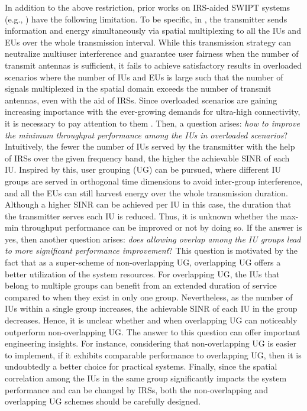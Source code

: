 \documentclass[12pt,draftclsnofoot, onecolumn]{IEEEtran}
\theoremstyle{plain}
\begin{document}
\begin{sloppypar}
In addition to the above restriction, prior works on IRS-aided SWIPT systems (e.g., \cite{2020_Qingqing_SWIPT_letter,2020_Qingqing_SWIPT_QoS,2020_Cunhua_SWIPT,2020_Wei_SWIPT_secure,2021_Shayan_SWIPT}) have the following limitation. To be specific, in \cite{2020_Qingqing_SWIPT_letter,2020_Qingqing_SWIPT_QoS,2020_Cunhua_SWIPT,2020_Wei_SWIPT_secure,2021_Shayan_SWIPT}, the transmitter sends information and energy simultaneously via spatial multiplexing to all the IUs and EUs over the whole transmission interval. While this transmission strategy can neutralize multiuser interference and guarantee user fairness when the number of transmit antennas is sufficient, it fails to achieve satisfactory results in overloaded scenarios where the number of IUs and EUs is large such that the number of signals multiplexed in the spatial domain exceeds the number of transmit antennas, even with the aid of IRSs. Since overloaded scenarios are gaining increasing importance with the ever-growing demands for ultra-high connectivity, it is necessary to pay attention to them \cite{2017_Hamdi_overloaded}. Then, a question arises: \emph{how to improve the minimum throughput performance among the IUs in overloaded scenarios}? Intuitively, the fewer the number of IUs served by the transmitter with the help of IRSs over the given frequency band, the higher the achievable SINR of each IU. Inspired by this, user grouping (UG) can be pursued, where different IU groups are served in orthogonal time dimensions to avoid inter-group interference, and all the EUs can still harvest energy over the whole transmission duration. Although a higher SINR can be achieved per IU in this case, the duration that the transmitter serves each IU is reduced. Thus, it is unknown whether the max-min throughput performance can be improved or not by doing so. If the answer is yes, then another question arises: \emph{does allowing overlap among the IU groups lead to more significant performance improvement}? This question is motivated by the fact that as a super-scheme of non-overlapping UG, overlapping UG offers a better utilization of the system resources. For overlapping UG, the IUs that belong to multiple groups can benefit from an extended duration of service compared to when they exist in only one group. Nevertheless, as the number of IUs within a single group increases, the achievable SINR of each IU in the group decreases. Hence, it is unclear whether and when overlapping UG can noticeably outperform non-overlapping UG. The answer to this question can offer important engineering insights. For instance, considering that non-overlapping UG is easier to implement, if it exhibits comparable performance to overlapping UG, then it is undoubtedly a better choice for practical systems. 
Finally, since the spatial correlation among the IUs in the same group significantly impacts the system performance and can be changed by IRSs, both the non-overlapping and overlapping UG schemes should be carefully designed. 


\end{sloppypar}
\end{document}

